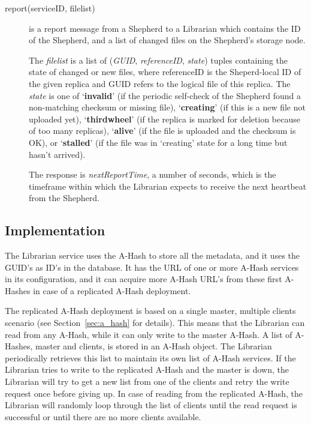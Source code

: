 \documentclass{book}
\begin{document}
\begin{description}
    \item [report(serviceID, filelist)] is a report message from a Shepherd to a Librarian which contains the ID of the Shepherd, and a list of changed files on the Shepherd's storage node.
        
    The \emph{filelist} is a list of (\emph{GUID}, \emph{referenceID}, \emph{state}) tuples containing the state of changed or new files, where referenceID is the Sheperd-local ID of the given replica and GUID refers to the logical file of this replica. The \emph{state} is one of `\textbf{invalid}' (if the periodic self-check of the Shepherd found a non-matching checksum or missing file), `\textbf{creating}' (if this is a new file not uploaded yet), `\textbf{thirdwheel}' (if the replica is marked for deletion because of too many replicas), `\textbf{alive}' (if the file is uploaded and the checksum is OK), or `\textbf{stalled}' (if the file was in `creating' state for a long time but hasn't arrived).
    
    The response is \emph{nextReportTime}, a number of seconds, which is the timeframe within which the Librarian expects to receive the next heartbeat from the Shepherd.

\end{description}


\subsection{Implementation} %

The Librarian service uses the A-Hash to store all the metadata, and it uses the GUID's as ID's in the database. It has the URL of one or more A-Hash services in its configuration, and it can acquire more A-Hash URL's from these first A-Hashes in case of a replicated A-Hash deployment.

The replicated A-Hash deployment is based on a single master, multiple clients scenario (see Section~\ref{sec:a_hash} for details). This means that the Librarian can read from any A-Hash, while it can only write to the master A-Hash. A list of A-Hashes, master and clients, is stored in an A-Hash object. The Librarian periodically retrieves this list to maintain its own list of A-Hash services. If the Librarian tries to write to the replicated A-Hash and the master is down, the Librarian will try to get a new list from one of the clients and retry the write request once before giving up. In case of reading from the replicated A-Hash, the Librarian will randomly loop through the list of clients until the read request is successful or until there are no more clients available.
\end{document}
